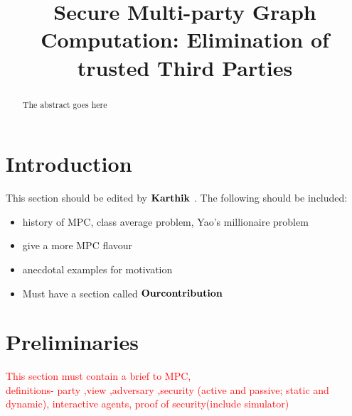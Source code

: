 \documentclass{llncs}
\begin{document}
\title{Secure Multi-party Graph Computation: Elimination of trusted Third Parties }
%


\maketitle
\begin{abstract}
The abstract goes here
\end{abstract}
\section{Introduction}
This section should be edited by $\bf{Karthik}$ . The following should be included:
\begin{itemize}
\item history of MPC, class average problem, Yao's millionaire problem
\item give a more MPC flavour
\item anecdotal examples for motivation
\item Must have a section called $\bf Our contribution$
\end{itemize}

\section{Preliminaries}

\textcolor{red}{This section must contain a brief to MPC, \\ definitions- party ,view ,adversary ,security (active and passive; static and dynamic), interactive agents, proof of security(include simulator) 
} 
\end{document}

